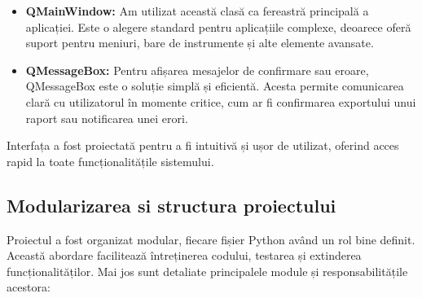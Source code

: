 \documentclass[12pt,a4paper]{article}
\begin{document}
\begin{itemize}
    \item \textbf{QMainWindow:} Am utilizat această clasă ca fereastră principală a aplicației. Este o alegere standard pentru aplicațiile complexe, deoarece oferă suport pentru meniuri, bare de instrumente și alte elemente avansate.

    \item \textbf{QMessageBox:} Pentru afișarea mesajelor de confirmare sau eroare, QMessageBox este o soluție simplă și eficientă. Acesta permite comunicarea clară cu utilizatorul în momente critice, cum ar fi confirmarea exportului unui raport sau notificarea unei erori.
\end{itemize}

Interfața a fost proiectată pentru a fi intuitivă și ușor de utilizat, oferind acces rapid la toate funcționalitățile sistemului.

\subsection{Modularizarea si structura proiectului}

\hspace{6mm}Proiectul a fost organizat modular, fiecare fișier Python având un rol bine definit. Această abordare facilitează întreținerea codului, testarea și extinderea funcționalităților. Mai jos sunt detaliate principalele module și responsabilitățile acestora:
\end{document}
